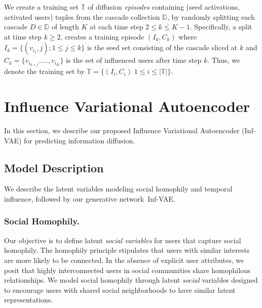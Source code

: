 \documentclass[sigconf]{acmart}
\newcommand{\name}{Inf-VAE}
\def\sD{{\mathbb{D}}}
\def\sT{{\mathbb{T}}}
\begin{document}
\vspace{-3pt}
We create a training set $\sT$ of diffusion \emph{episodes} containing (seed activations, activated users) tuples from the cascade collection $\sD$, by randomly splitting each cascade $D \in \sD$ of length $K$ at each time step $ 2 \leq k \leq K-1$.
Specifically, a split at time step $k \geq 2$, creates a training episode $(I_{k}, C_{k})$ where $I_k = \{ (v_{i_j}, j);  1 \leq j \leq k \}$ is the seed set consisting of the cascade sliced at $k$ and $C_{k} = \{ v_{i_{k+1}}, \dots, v_{i_K} \}$ is the set of influenced users after time step $k$. Thus, we denote the training set by $\sT = \{ (I_i, C_i ) \; 1 \leq i \leq |\sT| \}$.












\section{Influence Variational Autoencoder}
\label{sec:model}
In this section, we describe our proposed Influence Variational  Autoencoder (\name) for predicting information diffusion.


\subsection{Model Description}
We describe the latent variables modeling social homophily and temporal influence, followed by our generative network~\name.
\subsubsection{\textbf{Social Homophily.}}
\label{sec:structural}
Our objective is to define latent \textit{social variables} for users that capture social homophily.
The homophily principle stipulates that users with similar interests are more likely to be connected. In the absence of explicit user attributes, we posit that 
highly interconnected users in social communities share homophilous relationships.
We model social homophily through latent \textit{social} variables designed to encourage users with shared social neighborhoods to have similar latent representations.
\end{document}
